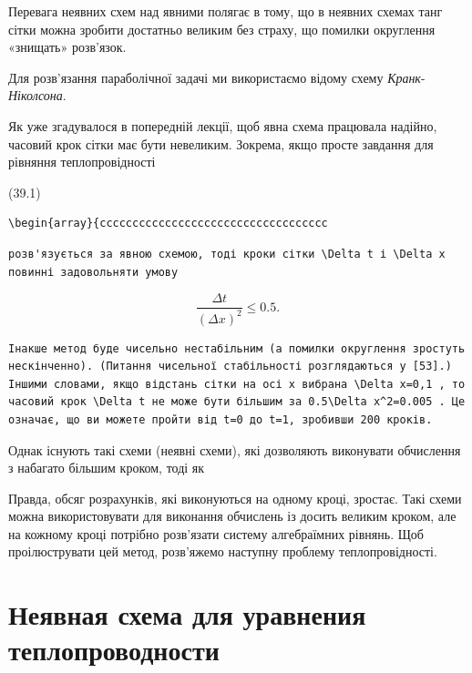 \documentclass[
  ukrainian,
]{article}
\begin{document}
Перевага неявних схем над явними полягає в тому, що в неявних схемах
танг сітки можна зробити достатньо великим без страху, що помилки
округлення «знищать» розв'язок.

Для розв'язання параболічної задачі ми використаємо відому схему
\emph{Кранк}-\emph{Ніколсона}.

Як уже згадувалося в попередній лекції, щоб явна схема працювала
надійно, часовий крок сітки має бути невеликим. Зокрема, якщо просте
завдання для рівняння теплопровідності

(39.1)

\begin{verbatim}
\begin{array}{ccccccccccccccccccccccccccccccccccc
\end{verbatim}

\begin{verbatim}
розв'язується за явною схемою, тоді кроки сітки \Delta t і \Delta x повинні задовольняти умову
\end{verbatim}

\[
\frac{\Delta t}{(\Delta x)^2} \leqslant 0.5.
\]

\begin{verbatim}
Інакше метод буде чисельно нестабільним (а помилки округлення зростуть нескінченно). (Питання чисельної стабільності розглядаються у [53].) Іншими словами, якщо відстань сітки на осі x вибрана \Delta x=0,1 , то часовий крок \Delta t не може бути більшим за 0.5\Delta x^2=0.005 . Це означає, що ви можете пройти від t=0 до t=1, зробивши 200 кроків.
\end{verbatim}

Однак існують такі схеми (неявні схеми), які дозволяють виконувати
обчислення з набагато більшим кроком, тоді як

Правда, обсяг розрахунків, які виконуються на одному кроці, зростає.
Такі схеми можна використовувати для виконання обчислень із досить
великим кроком, але на кожному кроці потрібно розв'язати систему
алгебраїмних рівнянь. Щоб проілюструвати цей метод, розв'яжемо наступну
проблему теплопровідності.

\section{Неявная схема для уравнения
теплопроводности}\label{ux43dux435ux44fux432ux43dux430ux44f-ux441ux445ux435ux43cux430-ux434ux43bux44f-ux443ux440ux430ux432ux43dux435ux43dux438ux44f-ux442ux435ux43fux43bux43eux43fux440ux43eux432ux43eux434ux43dux43eux441ux442ux438}
\end{document}

